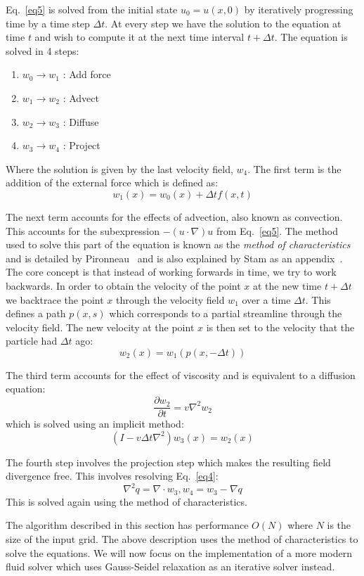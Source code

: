 Eq.~\ref{eq5} is solved from the initial state $u_0 = u(x,0)$ by iteratively progressing time by a time step $\Delta t$.
At every step we have the solution to the equation at time $t$ and wish to compute it at the next time interval $t + \Delta t$.
The equation is solved in 4 steps:
\begin{enumerate}
\item $w_{0} \to w_{1}$ : Add force
\item $w_1 \to w_2$ : Advect
\item $w_2 \to w_3$ : Diffuse
\item $w_3 \to w_4$ : Project
\end{enumerate}
Where the solution is given by the last velocity field, $w_4$.
The first term is the addition of the external force which is defined as:
\begin{equation}
w_1(x)=w_0(x) + \Delta t f(x,t)
\end{equation}

The next term accounts for the effects of advection, also known as convection.
This accounts for the subexpression $ -(u \cdot \nabla)u $ from Eq.~\ref{eq5}.
The method used to solve this part of the equation is known as the \emph{method of characteristics} and is detailed by Pironneau~\cite{pironneau2000method} and is also explained by Stam as an appendix~\cite{DBLP:conf/siggraph/Stam99a}.
The core concept is that instead of working forwards in time, we try to work backwards.
In order to obtain the velocity of the point $x$ at the new time $t + \Delta t$ we backtrace the point $x$ through the velocity field $w_1$ over a time $\Delta t$. 
This defines a path $p(x, s)$ which corresponds to a partial streamline through the velocity field.
The new velocity at the point $x$ is then set to the velocity that the particle had $\Delta t$ ago:
\begin{equation}
w_2(x) = w_1(p(x, - \Delta t))
\end{equation}

The third term accounts for the effect of viscosity and is equivalent to a diffusion equation:
\begin{equation}
\frac{\partial w_2}{\partial t} = v \nabla^2 w_2
\end{equation}
which is solved using an implicit method:
\begin{equation}
(I-v \Delta t \nabla^2) w_3(x) = w_2(x)
\end{equation}

The fourth step involves the projection step which makes the resulting field divergence free.
This involves resolving Eq.~\ref{eq4}:
\begin{equation}
\nabla^2q = \nabla \cdot w_3 , w_4 = w_3 - \nabla q
\end{equation}
This is solved again using the method of characteristics.

The algorithm described in this section has performance $O(N)$ where $N$ is the size of the input grid.
The above description uses the method of characteristics to solve the equations.
We will now focus on the implementation of a more modern fluid solver which uses Gauss-Seidel relaxation as an iterative solver instead.
